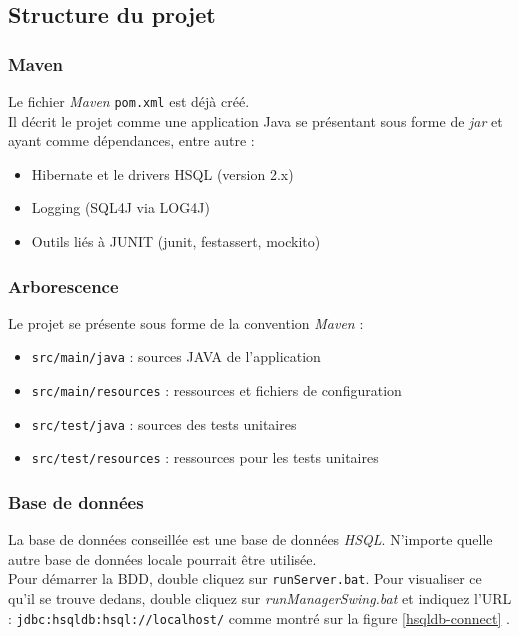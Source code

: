 \documentclass[small,algo]{dushClass} %
\begin{document}
\subsection{Structure du projet}

\subsubsection{Maven}

Le fichier \emph{Maven} \texttt{pom.xml} est déjà créé.\\

Il décrit le projet comme une application Java se présentant sous forme de \emph{jar} et ayant comme dépendances, entre autre :
\begin{itemize}
\item Hibernate et le drivers HSQL (version 2.x)
\item Logging (SQL4J via LOG4J)
\item Outils liés à JUNIT (junit, festassert, mockito)
\end{itemize}

\subsubsection{Arborescence}

Le projet se présente sous forme de la convention \emph{Maven} :
\begin{itemize}
\item \texttt{src/main/java} : sources JAVA de l'application
\item \texttt{src/main/resources} : ressources et fichiers de configuration
\item \texttt{src/test/java} : sources des tests unitaires
\item \texttt{src/test/resources} : ressources pour les tests unitaires
\end{itemize}

\subsubsection{Base de données}

La base de données conseillée est une base de données \emph{HSQL}. N'importe quelle autre base de données locale pourrait être utilisée.\\

Pour démarrer la BDD, double cliquez sur \texttt{runServer.bat}. Pour visualiser ce qu'il se trouve dedans, double cliquez sur \emph{runManagerSwing.bat} et indiquez l'URL : \texttt{jdbc:hsqldb:hsql://localhost/} comme montré sur la figure \ref{hsqldb-connect} .\\
\end{document}
